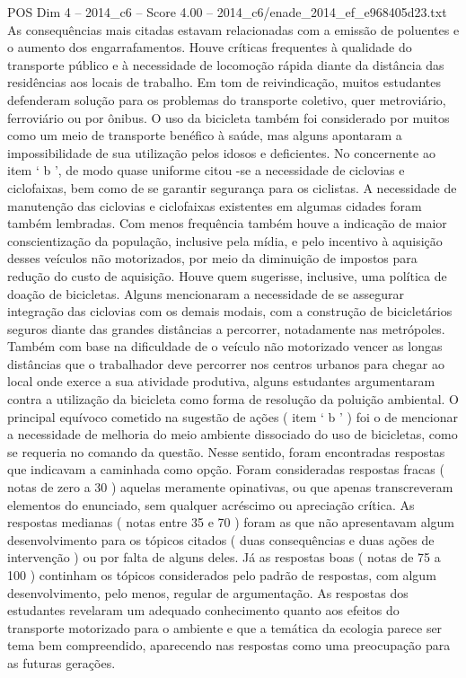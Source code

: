 \begin{textsample}{POS Dim 4 – 2014\_c6 – Score 4.00 – 2014\_c6/enade\_2014\_ef\_e968405d23.txt}
As consequências mais citadas estavam relacionadas com a emissão de poluentes e o aumento dos engarrafamentos.
Houve críticas frequentes à qualidade do transporte público e à necessidade de locomoção rápida diante da distância das residências aos locais de trabalho.
Em tom de reivindicação, muitos estudantes defenderam solução para os problemas do transporte coletivo, quer metroviário, ferroviário ou por ônibus.
O uso da bicicleta também foi considerado por muitos como um meio de transporte benéfico à saúde, mas alguns apontaram a impossibilidade de sua utilização pelos idosos e deficientes.
No concernente ao item ‘ b ’, de modo quase uniforme citou -se a necessidade de ciclovias e ciclofaixas, bem como de se garantir segurança para os ciclistas.
A necessidade de manutenção das ciclovias e ciclofaixas existentes em algumas cidades foram também lembradas.
Com menos frequência também houve a indicação de maior conscientização da população, inclusive pela mídia, e pelo incentivo à aquisição desses veículos não motorizados, por meio da diminuição de impostos para redução do custo de aquisição.
Houve quem sugerisse, inclusive, uma política de doação de bicicletas.
Alguns mencionaram a necessidade de se assegurar integração das ciclovias com os demais modais, com a construção de bicicletários seguros diante das grandes distâncias a percorrer, notadamente nas metrópoles.
Também com base na dificuldade de o veículo não motorizado vencer as longas distâncias que o trabalhador deve percorrer nos centros urbanos para chegar ao local onde exerce a sua atividade produtiva, alguns estudantes argumentaram contra a utilização da bicicleta como forma de resolução da poluição ambiental.
O principal equívoco cometido na sugestão de ações ( item ‘ b ’ ) foi o de mencionar a necessidade de melhoria do meio ambiente dissociado do uso de bicicletas, como se requeria no comando da questão.
Nesse sentido, foram encontradas respostas que indicavam a caminhada como opção.
Foram consideradas respostas fracas ( notas de zero a 30 ) aquelas meramente opinativas, ou que apenas transcreveram elementos do enunciado, sem qualquer acréscimo ou apreciação crítica.
As respostas medianas ( notas entre 35 e 70 ) foram as que não apresentavam algum desenvolvimento para os tópicos citados ( duas consequências e duas ações de intervenção ) ou por falta de alguns deles.
Já as respostas boas ( notas de 75 a 100 ) continham os tópicos considerados pelo padrão de respostas, com algum desenvolvimento, pelo menos, regular de argumentação.
As respostas dos estudantes revelaram um adequado conhecimento quanto aos efeitos do transporte motorizado para o ambiente e que a temática da ecologia parece ser tema bem compreendido, aparecendo nas respostas como uma preocupação para as futuras gerações.

\end{textsample}

